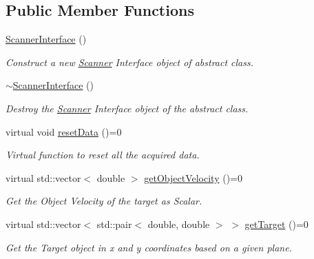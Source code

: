 \subsection*{Public Member Functions}
\begin{DoxyCompactItemize}
\item 
\mbox{\label{classScannerInterface_a6e56474f9979ef6c66a614f0991a9f99}} 
\hyperlink{classScannerInterface_a6e56474f9979ef6c66a614f0991a9f99}{Scanner\+Interface} ()
\begin{DoxyCompactList}\small\item\em Construct a new \hyperlink{classScanner}{Scanner} Interface object of abstract class. \end{DoxyCompactList}\item 
\mbox{\label{classScannerInterface_a25be999ce7d92de86814631974a96999}} 
\hyperlink{classScannerInterface_a25be999ce7d92de86814631974a96999}{$\sim$\+Scanner\+Interface} ()
\begin{DoxyCompactList}\small\item\em Destroy the \hyperlink{classScanner}{Scanner} Interface object of the abstract class. \end{DoxyCompactList}\item 
virtual void \hyperlink{classScannerInterface_a32a25bd134d2d346e3652eea3180ea7b}{reset\+Data} ()=0
\begin{DoxyCompactList}\small\item\em Virtual function to reset all the acquired data. \end{DoxyCompactList}\item 
virtual std\+::vector$<$ double $>$ \hyperlink{classScannerInterface_a7f6b7a9cd907c8fdde13784ae3caec00}{get\+Object\+Velocity} ()=0
\begin{DoxyCompactList}\small\item\em Get the Object Velocity of the target as Scalar. \end{DoxyCompactList}\item 
virtual std\+::vector$<$ std\+::pair$<$ double, double $>$ $>$ \hyperlink{classScannerInterface_a526bd963b27ac01be5844bfcb9ecdb27}{get\+Target} ()=0
\begin{DoxyCompactList}\small\item\em Get the Target object in x and y coordinates based on a given plane. \end{DoxyCompactList}\item 

\end{DoxyCompactItemize}
